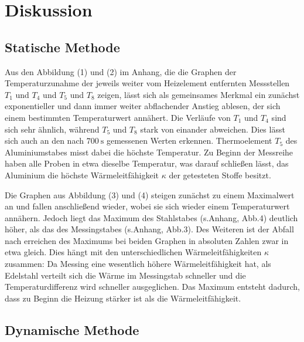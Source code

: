 
\section{Diskussion}
\label{sec:Diskussion}

\subsection{Statische Methode}

Aus den Abbildung (1) und (2) im Anhang, die die Graphen der Temperaturzunahme der jeweils weiter vom Heizelement entfernten Messstellen $T_\text{1}$ und $T_\text{4}$ und $T_\text{5}$ und $T_\text{8}$ zeigen, lässt sich als gemeinsames Merkmal ein zunächst exponentieller und dann immer weiter abflachender Anstieg ablesen, der sich einem bestimmten Temperaturwert annähert.
Die Verläufe von $T_\text{1}$ und $T_\text{4}$ sind sich sehr ähnlich, während $T_\text{5}$ und $T_\text{8}$ stark von einander abweichen.\newline
Dies lässt sich auch an den nach $\SI{700}{\second}$ gemessenen Werten erkennen.
Thermoelement $T_\text{5}$ des Aluminiumstabes misst dabei die höchste Temperatur.
Zu Beginn der Messreihe haben alle Proben in etwa dieselbe Temperatur, was darauf schließen lässt, das Aluminium die höchste Wärmeleitfähigkeit $\kappa$ der getesteten Stoffe besitzt.

Die Graphen aus Abbildung (3) und (4) steigen zunächst zu einem Maximalwert an und fallen anschließend wieder, wobei sie sich wieder einem Temperaturwert annähern.
Jedoch liegt das Maximum des Stahlstabes (s.Anhang, Abb.4)
deutlich höher, als das des Messingstabes (s.Anhang, Abb.3).
Des Weiteren ist der Abfall nach erreichen des Maximums bei beiden Graphen in absoluten Zahlen zwar in etwa gleich.
Dies hängt mit den unterschiedlichen Wärmeleitfähigkeiten $\kappa$ zusammen:
Da Messing eine wesentlich höhere Wärmeleitfähigkeit hat, als Edelstahl verteilt sich die Wärme im Messingstab schneller und die Temperaturdifferenz wird schneller ausgeglichen.
Das Maximum entsteht dadurch, dass zu Beginn die Heizung stärker ist als die Wärmeleitfähigkeit.

\subsection{Dynamische Methode}

